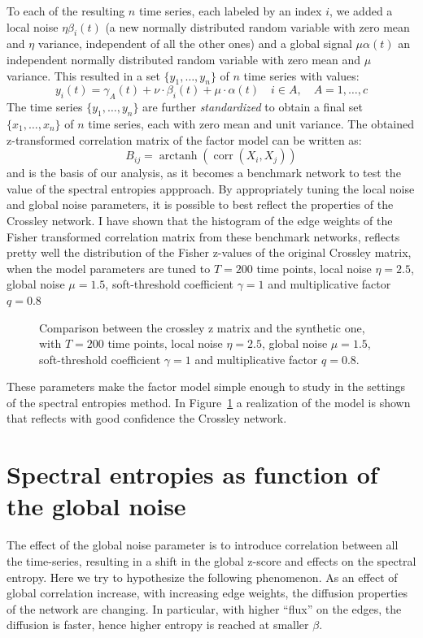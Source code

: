 \documentclass[a4paper]{article}
\DeclareMathOperator\arctanh{arctanh}
\DeclareMathOperator\corr{corr}
\begin{document}
To each of the resulting $n$ time series, each labeled by an index $i$, we added a local noise $\eta \beta_i(t)$ (a new normally distributed random variable with zero mean and $\eta$ variance, independent of all the other ones) and a global signal $\mu \alpha(t)$ an independent normally distributed random variable with zero mean and $\mu$ variance.
This resulted in a set $\{y_1,\dots,y_n\}$ of $n$ time series with values:
\begin{equation}
y_i(t)= \gamma_A(t) + \nu\cdot \beta_i(t) + \mu\cdot \alpha(t) \quad i\in A, \quad A=1,\ldots,c
\label{eq:bench}
\end{equation}
The time series $\{y_1,\dots,y_n\}$ are further \emph{standardized} to obtain a final set $\{x_1,\dots,x_n\}$ of $n$ time series, each with zero mean and unit variance.
The obtained z-transformed correlation matrix of the factor model can be written as:
\begin{equation}
B_{ij} = \arctanh\left( \corr(X_i, X_j) \right)
\end{equation}
and is the basis of our analysis, as it becomes a benchmark network to test the value of the spectral entropies appproach.
By appropriately tuning the local noise and global noise parameters, it is possible to best reflect the properties of the Crossley network.
I have shown that the histogram of the edge weights of the Fisher transformed correlation matrix from these benchmark networks, reflects pretty well the distribution of the Fisher z-values of the original Crossley matrix, when the model parameters are tuned to $T=200$ time points, local noise $\eta=2.5$, global noise $\mu=1.5$, soft-threshold coefficient $\gamma=1$ and multiplicative factor $q=0.8$
\begin{figure}
\caption{Comparison between the crossley z matrix and the synthetic one, with $T=200$ time points, local noise $\eta=2.5$, global noise $\mu=1.5$, soft-threshold coefficient $\gamma=1$ and multiplicative factor $q=0.8$.}
\label{fig:benchmark_network}
\end{figure}

These parameters make the factor model simple enough to study in the settings of the spectral entropies method. In Figure~\ref{fig:benchmark_network} a realization of the model is shown that reflects with good confidence the Crossley network.

\section{Spectral entropies as function of the global noise}
The effect of the global noise parameter is to introduce correlation between all the time-series, resulting in a shift in the global z-score and effects on the spectral entropy. 
Here we try to hypothesize the following phenomenon. As an effect of global correlation increase, with increasing edge weights, the diffusion properties of the network are changing. In particular, with higher ``flux'' on the edges, the diffusion is faster, hence higher entropy is reached at smaller $\beta$.
\end{document}
